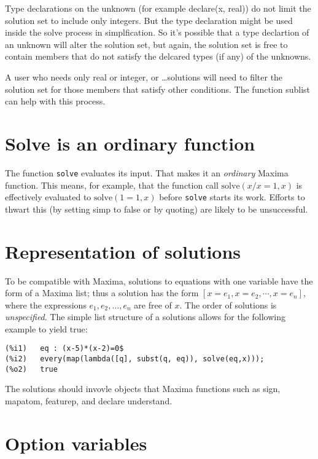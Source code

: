 \documentclass[]{article}%
\newcommand{\solve}{\texttt{solve}}
\begin{document}
Type declarations on the unknown (for example declare(x, real)) do not limit the solution set to include only integers. But the type declaration might be used inside the solve process in simplfication. So it's possible that a type declartion of an unknown will alter the solution set, but again, the solution set is free to contain members that do not satisfy the delcared types (if any) of the unknowns.

A user who needs only real or integer, or \dots solutions will need to filter the solution set for those members that satisfy other conditions. The function sublist can help with this process.

\section{Solve is an ordinary function}

The function \solve \/ evaluates its input. That makes it an \emph{ordinary} Maxima function. This means, for example, that the function call \(\mathrm{solve}(x/x=1,x)\) is effectively evaluated to \(\mathrm{solve}(1=1,x)\) before \solve \/ starts its work. Efforts to thwart this (by setting simp to false or by quoting) are likely to be unsuccessful.

\section{Representation of solutions}

To be compatible with Maxima, solutions to equations with one variable have the form of a Maxima list; thus a solution has the form \([x = e_1, x = e_2, \cdots, x = e_n]\), where the expressions \(e_1, e_2, \dots, e_n\) are free of \(x\). The order of solutions is \emph{unspecified}. The simple list structure of a solutions allows for the following example to yield true:

\begin{verbatim}
(%i1)	eq : (x-5)*(x-2)=0$
(%i2)	every(map(lambda([q], subst(q, eq)), solve(eq,x)));
(%o2)	true
\end{verbatim}

The solutions should invovle objects that Maxima functions such as sign, mapatom, featurep, and declare understand.

\section{Option variables}
\end{document}
